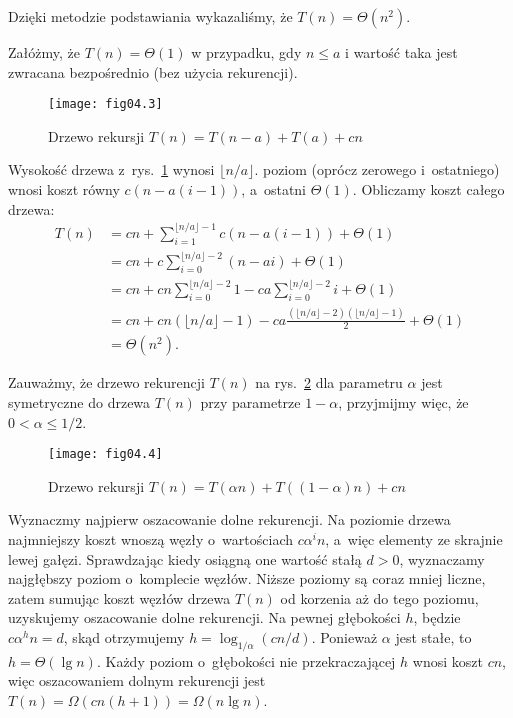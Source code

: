 Dzięki metodzie podstawiania wykazaliśmy, że $T(n)=\Theta(n^2)$.

\exercise %
Załóżmy, że $T(n)=\Theta(1)$ w przypadku, gdy $n\le a$ i wartość taka jest zwracana bezpośrednio (bez użycia rekurencji).
\begin{figure}[ht]
	\begin{center}
		\texttt{[image: fig04.3]}
	\end{center}
	\caption{Drzewo rekursji $T(n)=T(n-a)+T(a)+cn$} \label{fig:4.2-4}
\end{figure}
Wysokość drzewa z~rys.~\ref{fig:4.2-4} wynosi $\lfloor n/a\rfloor$.  poziom (oprócz zerowego i~ostatniego) wnosi koszt równy $c(n-a(i-1))$, a~ostatni $\Theta(1)$. Obliczamy koszt całego drzewa:
\begin{align*}
	T(n) &= cn+\sum_{i=1}^{\lfloor n/a\rfloor-1}c(n-a(i-1))+\Theta(1) \\
	&= cn+c\sum_{i=0}^{\lfloor n/a\rfloor-2}(n-ai)+\Theta(1) \\
	&= cn+cn\sum_{i=0}^{\lfloor n/a\rfloor-2}1-ca\sum_{i=0}^{\lfloor n/a\rfloor-2}i+\Theta(1) \\
	&= cn+cn(\lfloor n/a\rfloor-1)-ca\frac{(\lfloor n/a\rfloor-2)(\lfloor n/a\rfloor-1)}{2}+\Theta(1) \\[2mm]
	&= \Theta(n^2).
\end{align*}

\exercise %
Zauważmy, że drzewo rekurencji $T(n)$ na rys.~\ref{fig:4.2-5} dla parametru $\alpha$ jest symetryczne do drzewa $T(n)$ przy parametrze $1-\alpha$, przyjmijmy więc, że $0<\alpha\le1/2$.
\begin{figure}[ht]
	\begin{center}
		\texttt{[image: fig04.4]}
	\end{center}
	\caption{Drzewo rekursji $T(n)=T(\alpha n)+T((1-\alpha)n)+cn$} \label{fig:4.2-5}
\end{figure}

Wyznaczmy najpierw oszacowanie dolne rekurencji. Na  poziomie drzewa najmniejszy koszt wnoszą węzły o~wartościach $c\alpha^in$, a~więc elementy ze skrajnie lewej gałęzi. Sprawdzając kiedy osiągną one wartość stałą $d>0$, wyznaczamy najgłębszy poziom o~komplecie węzłów. Niższe poziomy są coraz mniej liczne, zatem sumując koszt węzłów drzewa $T(n)$ od korzenia aż do tego poziomu, uzyskujemy oszacowanie dolne rekurencji. Na pewnej głębokości $h$, będzie $c\alpha^hn=d$, skąd otrzymujemy $h=\log_{1/\alpha}(cn/d)$. Ponieważ $\alpha$ jest stałe, to $h=\Theta(\lg n)$. Każdy poziom o~głębokości nie przekraczającej $h$ wnosi koszt $cn$, więc oszacowaniem dolnym rekurencji jest $T(n)=\Omega(cn(h+1))=\Omega(n\lg n)$.

